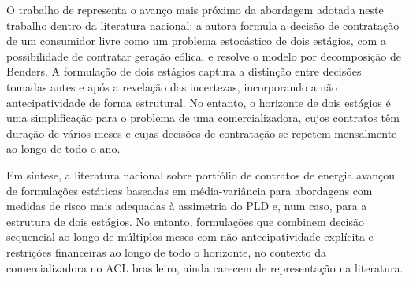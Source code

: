 O trabalho de  representa o avanço mais próximo da abordagem adotada neste trabalho dentro da literatura nacional: a autora formula a decisão de contratação de um consumidor livre como um problema estocástico de dois estágios, com a possibilidade de contratar geração eólica, e resolve o modelo por decomposição de Benders. A formulação de dois estágios captura a distinção entre decisões tomadas antes e após a revelação das incertezas, incorporando a não antecipatividade de forma estrutural. No entanto, o horizonte de dois estágios é uma simplificação para o problema de uma comercializadora, cujos contratos têm duração de vários meses e cujas decisões de contratação se repetem mensalmente ao longo de todo o ano.

Em síntese, a literatura nacional sobre portfólio de contratos de energia avançou de formulações estáticas baseadas em média-variância para abordagens com medidas de risco mais adequadas à assimetria do PLD e, num caso, para a estrutura de dois estágios. No entanto, formulações que combinem decisão sequencial ao longo de múltiplos meses com não antecipatividade explícita e restrições financeiras ao longo de todo o horizonte, no contexto da comercializadora no ACL brasileiro, ainda carecem de representação na literatura.
